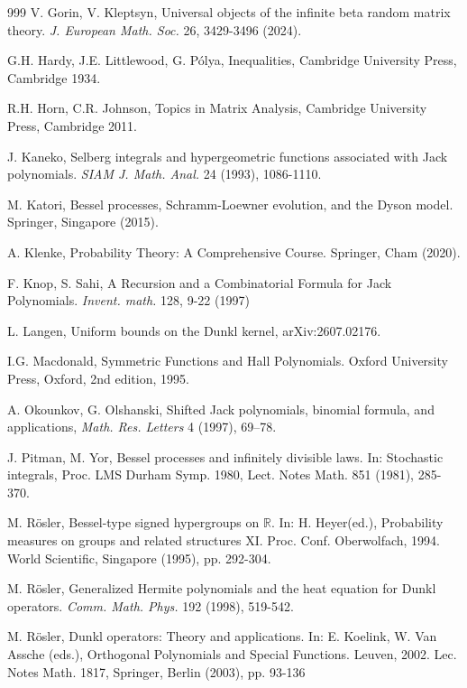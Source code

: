 \documentclass[reqno]{amsart}
\theoremstyle{plain}
\theoremstyle{definition}
\numberwithin{equation}{section}
\begin{document}
\begin{thebibliography}{999}
     V. Gorin, V. Kleptsyn, Universal objects of the infinite beta random matrix theory.
      \textit{ J. European Math. Soc.} 26, 3429-3496 (2024).

      
 G.H. Hardy, J.E. Littlewood, G. P\'olya, Inequalities, Cambridge University Press, Cambridge 1934.


 R.H. Horn, C.R. Johnson, Topics in Matrix Analysis, Cambridge University Press, Cambridge 2011.


 J. Kaneko, Selberg integrals and hypergeometric functions associated with Jack polynomials. 
  \textit{SIAM J. Math. Anal.} 24 (1993),  1086-1110.


   M. Katori, 
Bessel processes, Schramm-Loewner evolution, and the Dyson model.
 Springer, Singapore (2015).

 A. Klenke, Probability Theory: A Comprehensive Course. Springer, Cham (2020).
  
 F. Knop, S. Sahi, A Recursion and a Combinatorial Formula for Jack Polynomials. \textit{Invent. math.} 128, 9-22 (1997)

 L. Langen, Uniform bounds on the Dunkl kernel,  arXiv:2607.02176.

 I.G. Macdonald, Symmetric Functions and Hall Polynomials. Oxford University Press, Oxford, 2nd edition, 1995.

  A. Okounkov, G. Olshanski, Shifted Jack polynomials, binomial formula, and applications,
  \textit{ Math. Res. Letters} 4 (1997), 69–78.

 J. Pitman,  M. Yor, 
Bessel processes and infinitely divisible laws. In:
Stochastic integrals, Proc. LMS Durham Symp. 1980, Lect. Notes Math. 851 (1981), 285-370. 

  M. R\"osler, 
Bessel-type signed hypergroups on $\mathbb R$. In:
H. Heyer(ed.), Probability measures on groups and related structures XI. Proc. Conf. Oberwolfach,  1994.
World Scientific, 
Singapore (1995), pp. 292-304. 

   M. R\"osler,
Generalized Hermite polynomials and the heat equation for Dunkl operators.
\textit{Comm. Math. Phys.} 192 (1998),  519-542.

 M. R\"osler,
Dunkl operators: Theory and applications.
In: E. Koelink, W. Van Assche (eds.), Orthogonal Polynomials and Special Functions. Leuven, 2002. Lec. Notes Math. 1817, Springer, Berlin (2003), pp. 93-136


\end{thebibliography}
\end{document}
